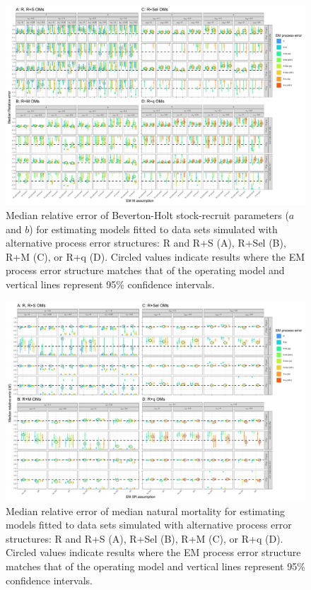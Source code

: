 \documentclass[
  12pt,
]{article}
\begin{document}
\begin{landscape}
\begin{figure}
\begin{center}
\includegraphics{sr_bias_plots}
\end{center}
\caption{Median relative error of Beverton-Holt stock-recruit parameters ($a$ and $b$) for estimating models fitted to data sets simulated with alternative process error structures: R and R+S (A), R+Sel (B), R+M (C), or R+q (D). Circled values indicate results where the EM process error structure matches that of the operating model and vertical lines represent 95\% confidence intervals.}\label{SR_rel_error}
\end{figure}
\end{landscape}

\begin{landscape}
\begin{figure}
\begin{center}
\includegraphics{M_bias_plots}
\end{center}
\caption{Median relative error of median natural mortality for estimating models fitted to data sets simulated with alternative process error structures: R and R+S (A), R+Sel (B), R+M (C), or R+q (D). Circled values indicate results where the EM process error structure matches that of the operating model and vertical lines represent 95\% confidence intervals.}\label{M_rel_error}
\end{figure}
\end{landscape}
\end{document}
